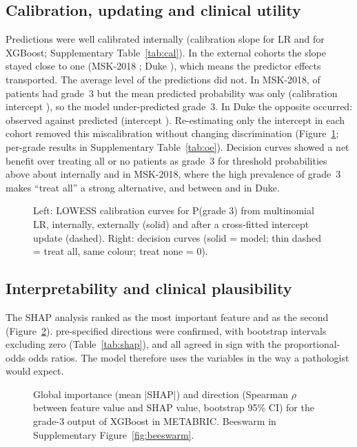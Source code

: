 \subsection{Calibration, updating and clinical utility}
Predictions were well calibrated internally (calibration slope \CalSlopeInt{} for LR and
\CalSlopeIntXgb{} for XGBoost; Supplementary Table~\ref{tab:cal}). In the external cohorts the slope
stayed close to one (MSK-2018 \CalSlopeMskRaw; Duke \CalSlopeDukeRaw), which means the predictor
effects transported. The average level of the predictions did not. In MSK-2018, \PrevMsk{} of
patients had grade~3 but the mean predicted probability was only \PredMsk{} (calibration intercept
\CalIntMskRaw), so the model under-predicted grade~3. In Duke the opposite occurred: \PrevDuke{}
observed against \PredDuke{} predicted (intercept \CalIntDukeRaw). Re-estimating only the intercept
in each cohort removed this miscalibration without changing discrimination (Figure~\ref{fig:cal};
per-grade results in Supplementary Table~\ref{tab:oe}). Decision curves showed a net benefit over
treating all or no patients as grade~3 for threshold probabilities above about \DcaLoInt{}
internally and \DcaLoExt{} in MSK-2018, where the high prevalence of grade~3 makes ``treat all'' a
strong alternative, and between \DcaLoDuke{} and \DcaHiDuke{} in Duke.

\begin{figure}[htbp]\centering
{}
\caption{Left: LOWESS calibration curves for P(grade 3) from multinomial LR, internally, externally
(solid) and after a cross-fitted intercept update (dashed). Right: decision curves (solid = model;
thin dashed = treat all, same colour; treat none = 0).}\label{fig:cal}
\end{figure}

\subsection{Interpretability and clinical plausibility}
The SHAP analysis ranked \ShapTop{} as the most important feature and \ShapSecond{} as the second
(Figure~\ref{fig:shap}). \ShapAgree{} pre-specified directions were confirmed, with bootstrap
intervals excluding zero (Table~\ref{tab:shap}), and all agreed in sign with the proportional-odds
odds ratios. The model therefore uses the variables in the way a pathologist would expect.

\begin{figure}[htbp]\centering
{}
\caption{Global importance (mean $|$SHAP$|$) and direction (Spearman $\rho$ between feature value and
SHAP value, bootstrap 95\% CI) for the grade-3 output of XGBoost in METABRIC. Beeswarm in
Supplementary Figure~\ref{fig:beeswarm}.}\label{fig:shap}
\end{figure}

